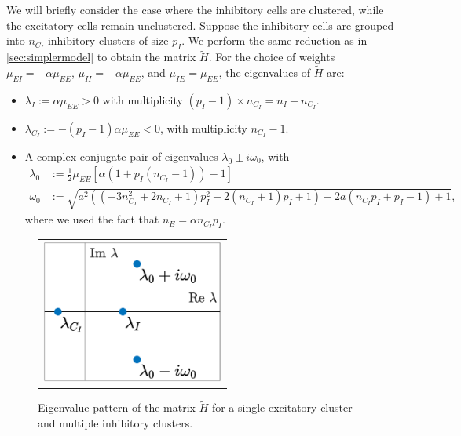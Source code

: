 \documentclass[reqno]{siamonline190516}
\begin{document}
We will briefly consider the case where the inhibitory cells are clustered, while the excitatory cells remain unclustered. Suppose the inhibitory cells are grouped into $n_{C_I}$ inhibitory clusters of size $p_I$. We perform the same reduction as in \cref{sec:simplermodel} to obtain the matrix $\tilde{H}$. For the choice of weights $\mu_{EI} = -\alpha \mu_{EE}$, $\mu_{II} = -\alpha \mu_{EE}$, and $\mu_{IE} = \mu_{EE}$, the eigenvalues of $\tilde{H}$ are:
\begin{itemize}
\item $\lambda_I := \alpha \mu_{EE} > 0$ with multiplicity $(p_I-1) \times n_{C_I} = n_I - n_{C_I}$.
\item $\lambda_{C_I} := -(p_I-1)\alpha \mu_{EE} < 0$, with multiplicity $n_{C_I}-1$.
\item A complex conjugate pair of eigenvalues $\lambda_0 \pm i \omega_0$, with 
\begin{align*}
    \lambda_0 &:= \frac{1}{2}\mu_{EE} \left[ \alpha( 1 + p_I(n_{C_I}-1)) -1 \right]
      \\
    \omega_0 &:= \sqrt{a^2 \left(\left(-3 n_{C_I}^2+2 n_{C_I}+1\right) p_I^2-2 (n_{C_I}+1) p_I+1\right)-2 a
    (n_{C_I}p_I +p_I -1)+1},
\end{align*}
where we used the fact that $n_E = \alpha n_{C_I} p_I$.
\end{itemize}

\begin{figure}
    \centering
    \begin{tabular}{c}
    \includegraphics[width=6cm]{eigpattern3.eps}
    \end{tabular}
    \caption{Eigenvalue pattern of the matrix $\tilde{H}$ for a single excitatory cluster and multiple inhibitory clusters.}
    \label{fig:HeigpatternIcluster}
\end{figure}
\end{document}
